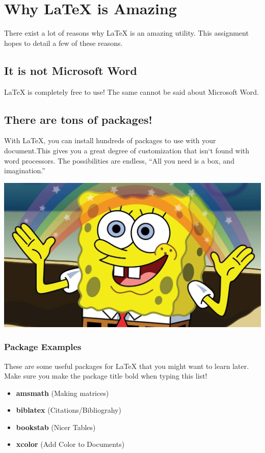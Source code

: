 \section{Why LaTeX is Amazing}
{There exist a lot of reasons why LaTeX is an amazing utility. This assignment hopes to detail a few of these reasons.}

\subsection{It is not Microsoft Word}
{LaTeX is completely free to use!  The same cannot be said about Microsoft Word.}

\subsection{There are tons of packages!}
{With LaTeX, you can install hundreds of packages to use with your document.This gives you a great degree of customization that isn`t found with word processors. The possibilities are endless, ``All you need is a box, and imagination.''}

\begin{center}
    \includegraphics[scale =0.17]{imagination.png}
\end{center}

\subsubsection{Package Examples}
{These are some useful packages for LaTeX that you might want to learn later. Make sure you make the package title bold when typing this list!}
\begin{itemize}
    \item \textbf{amsmath} (Making matrices)
    \item \textbf{biblatex} (Citations/Bibliograhy)
    \item \textbf{bookstab} (Nicer Tables)
    \item \textbf{xcolor} (Add Color to Documents)
\end{itemize}

